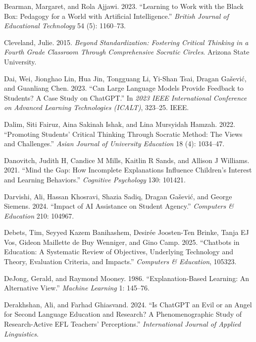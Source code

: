 \documentclass[
  12pt,
]{article}
\newlength{\cslhangindent}
\newenvironment{CSLReferences}[2] %
 {\begin{list}{}{%
  \setlength{\itemindent}{0pt}
  \setlength{\leftmargin}{0pt}
  \setlength{\parsep}{0pt}
  \ifodd #1
   \setlength{\leftmargin}{\cslhangindent}
   \setlength{\itemindent}{-1\cslhangindent}
  \fi
  \setlength{\itemsep}{#2\baselineskip}}}
 {\end{list}}
\begin{document}
\label{refs}
\begin{CSLReferences}{1}{0}
Bearman, Margaret, and Rola Ajjawi. 2023. {``Learning to Work with the Black Box: Pedagogy for a World with Artificial Intelligence.''} \emph{British Journal of Educational Technology} 54 (5): 1160--73.

Cleveland, Julie. 2015. \emph{Beyond Standardization: Fostering Critical Thinking in a Fourth Grade Classroom Through Comprehensive Socratic Circles}. Arizona State University.

Dai, Wei, Jionghao Lin, Hua Jin, Tongguang Li, Yi-Shan Tsai, Dragan Gašević, and Guanliang Chen. 2023. {``Can Large Language Models Provide Feedback to Students? A Case Study on ChatGPT.''} In \emph{2023 IEEE International Conference on Advanced Learning Technologies (ICALT)}, 323--25. IEEE.

Dalim, Siti Fairuz, Aina Sakinah Ishak, and Lina Mursyidah Hamzah. 2022. {``Promoting Students' Critical Thinking Through Socratic Method: The Views and Challenges.''} \emph{Asian Journal of University Education} 18 (4): 1034--47.

Danovitch, Judith H, Candice M Mills, Kaitlin R Sands, and Allison J Williams. 2021. {``Mind the Gap: How Incomplete Explanations Influence Children's Interest and Learning Behaviors.''} \emph{Cognitive Psychology} 130: 101421.

Darvishi, Ali, Hassan Khosravi, Shazia Sadiq, Dragan Gašević, and George Siemens. 2024. {``Impact of AI Assistance on Student Agency.''} \emph{Computers \& Education} 210: 104967.

Debets, Tim, Seyyed Kazem Banihashem, Desirée Joosten-Ten Brinke, Tanja EJ Vos, Gideon Maillette de Buy Wenniger, and Gino Camp. 2025. {``Chatbots in Education: A Systematic Review of Objectives, Underlying Technology and Theory, Evaluation Criteria, and Impacts.''} \emph{Computers \& Education}, 105323.

DeJong, Gerald, and Raymond Mooney. 1986. {``Explanation-Based Learning: An Alternative View.''} \emph{Machine Learning} 1: 145--76.

Derakhshan, Ali, and Farhad Ghiasvand. 2024. {``Is ChatGPT an Evil or an Angel for Second Language Education and Research? A Phenomenographic Study of Research-Active EFL Teachers' Perceptions.''} \emph{International Journal of Applied Linguistics}.


\end{CSLReferences}
\end{document}
